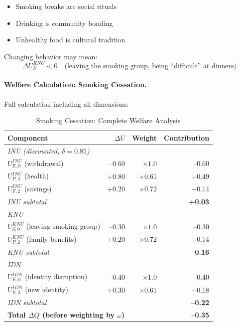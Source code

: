 \begin{itemize}
\item Smoking breaks are social rituals
\item Drinking is community bonding
\item Unhealthy food is cultural tradition
\end{itemize}

Changing behavior may mean:
\begin{equation}
\Delta U^{KNU}_S < 0 \quad \text{(leaving the smoking group, being ``difficult'' at dinners)}
\end{equation}

\paragraph{Welfare Calculation: Smoking Cessation.}
Full calculation including all dimensions:

\begin{table}[htbp]
\centering
\caption{Smoking Cessation: Complete Welfare Analysis}
\label{tab:smoking-welfare}
\renewcommand{\arraystretch}{1.2}
\begin{tabular}{@{}lrrr@{}}
\toprule
\textbf{Component} & \textbf{$\Delta U$} & \textbf{Weight} & \textbf{Contribution} \\
\midrule
\multicolumn{4}{l}{\textit{INU (discounted, $\delta = 0.85$)}} \\
$U^{INU}_{E,0}$ (withdrawal) & --0.60 & $\times 1.0$ & --0.60 \\
$U^{INU}_{P,3}$ (health) & +0.80 & $\times 0.61$ & +0.49 \\
$U^{INU}_{F,2}$ (savings) & +0.20 & $\times 0.72$ & +0.14 \\
\textit{INU subtotal} & & & \textbf{+0.03} \\
\midrule
\multicolumn{4}{l}{\textit{KNU}} \\
$U^{KNU}_{S,0}$ (leaving smoking group) & --0.30 & $\times 1.0$ & --0.30 \\
$U^{KNU}_{P,2}$ (family benefits) & +0.20 & $\times 0.72$ & +0.14 \\
\textit{KNU subtotal} & & & \textbf{--0.16} \\
\midrule
\multicolumn{4}{l}{\textit{IDN}} \\
$U^{IDN}_{E,0}$ (identity disruption) & --0.40 & $\times 1.0$ & --0.40 \\
$U^{IDN}_{E,3}$ (new identity) & +0.30 & $\times 0.61$ & +0.18 \\
\textit{IDN subtotal} & & & \textbf{--0.22} \\
\midrule
\multicolumn{3}{l}{\textbf{Total $\Delta Q$ (before weighting by $\omega$)}} & \textbf{--0.35} \\
\bottomrule
\end{tabular}
\end{table}

